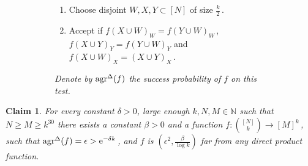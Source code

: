 \documentclass[11pt]{article}
\numberwithin{equation}{section}
\newtheorem{claim}[theorem]{Claim}
\theoremstyle{definition}
\theoremstyle{plain}
\newcommand{\eee}{\mathrm e}
\newcommand\f{f} %
\newcommand\setf{f} %
\newcommand{\test}[2]{
	\ifx &#2&
	\textrm{agr}^{#1}
	\else	
	\textrm{agr}^{#1}_{#2}
	\fi}
\newcommand{\sets}{\binom{[N]}{k}} %
\begin{document}
\begin{figure}[ht]
	\label{test:triangle}
	\centering
	\begin{subfigure}{0.58\textwidth}
		\begin{enumerate}
			\item Choose disjoint $W,X,Y\subset [N]$ of size $\frac{k}{2}$\,.
			\item Accept if $\setf(X\cup W)_W = \setf(Y\cup W)_W$\,, $\setf(X\cup Y)_Y= \setf(Y\cup W)_Y$ and $\setf(X\cup W)_X =(X\cup Y)_X$\,.
		\end{enumerate}
	\end{subfigure}
	\hfill
%
	\begin{subfigure}{0.4\textwidth}
		\centering
	\end{subfigure}
	\vspace{2pt}
%
	\begin{subfigure}{\textwidth}
		\vspace{5pt}
		\emph{Denote by $\test{\Delta}{}(f)$ the success probability of $\f$ on this test.}
	\end{subfigure}
\end{figure}
\begin{claim}
	For every constant $\delta >0$, large enough $k,N,M\in\mathbb{N}$ such that $N\geq M\geq k^{30}$  there exists a constant $\beta >0$ and a function $\f:\sets\rightarrow[M]^k$\,, such that $\test{\Delta}{}(f) = \epsilon > \eee^{-\delta k}$\,, and $\f$ is $(\epsilon^2, \frac{\beta}{\log k})$ far from any direct product function.
\end{claim}
\end{document}
